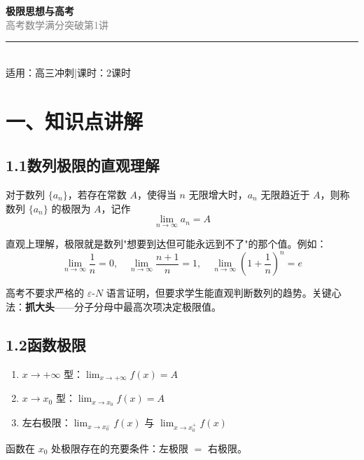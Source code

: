 \documentclass[12pt, a4paper]{ctexart}
\begin{document}
\begin{center}
{\Huge\bfseries\textcolor{mainblue}{极限思想与高考}}\\[12pt]
{\Large\textcolor{gray}{高考数学满分突破\quad 第1讲}}\\[8pt]
\rule{0.6\textwidth}{1pt}\\[8pt]
{\normalsize 适用：高三冲刺\quad |\quad 课时：2课时}
\end{center}
\vspace{10pt}

\section*{\textcolor{mainblue}{一、知识点讲解}}

\subsection*{1.1\quad 数列极限的直观理解}

\begin{knowledgebox}[定义]
对于数列 $\{a_n\}$，若存在常数 $A$，使得当 $n$ 无限增大时，$a_n$ 无限趋近于 $A$，则称数列 $\{a_n\}$ 的极限为 $A$，记作
\[
\lim_{n \to \infty} a_n = A
\]
\end{knowledgebox}

直观上理解，极限就是数列"想要到达但可能永远到不了"的那个值。例如：
\[
\lim_{n \to \infty} \frac{1}{n} = 0, \quad \lim_{n \to \infty} \frac{n+1}{n} = 1, \quad \lim_{n \to \infty} \left(1 + \frac{1}{n}\right)^n = e
\]

\begin{tipbox}[高考中的直觉应用]
高考不要求严格的 $\varepsilon$-$N$ 语言证明，但要求学生能直观判断数列的趋势。关键心法：\textbf{抓大头}——分子分母中最高次项决定极限值。
\end{tipbox}

\subsection*{1.2\quad 函数极限}

\begin{knowledgebox}[函数极限的几种形式]
\begin{enumerate}[leftmargin=2em]
  \item $x \to +\infty$ 型：$\displaystyle\lim_{x \to +\infty} f(x) = A$
  \item $x \to x_0$ 型：$\displaystyle\lim_{x \to x_0} f(x) = A$
  \item 左右极限：$\displaystyle\lim_{x \to x_0^-} f(x)$ 与 $\displaystyle\lim_{x \to x_0^+} f(x)$
\end{enumerate}
函数在 $x_0$ 处极限存在的充要条件：左极限 $=$ 右极限。
\end{knowledgebox}
\end{document}
